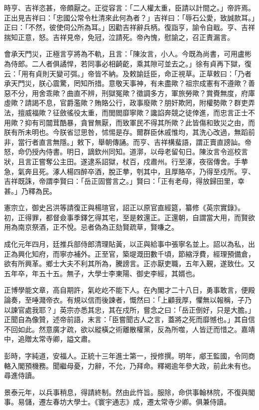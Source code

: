 \begin{pinyinscope}
時亨、吉祥恣甚，帝頗厭之。正從容言：「二人權太重，臣請以計間之。」帝許焉。正出見吉祥曰：「忠國公常令杜清來此何為者？」吉祥曰：「辱石公愛，致誠款耳。」正曰：「不然，彼使伺公所為耳。」因勸吉祥辭兵柄。復詣亨，諭令自戢。亨、吉祥揣知正意，怒。吉祥見帝，免冠，泣請死。帝內愧，慰諭之，召正責漏言。

會承天門災，正極言亨將為不軌，且言：「陳汝言，小人。今既為尚書，可用盧彬為侍郎。二人者俱譎悍，若同事必相齮齕，乘其隙可並去之。」徐有貞再下獄，復云：「用有貞則天變可弭。」帝皆不納。及敕諭廷臣，命正視草。正草敕曰：「乃者承天門災，朕心震驚，罔知所措。意敬天事神，有未盡歟？祖宗成憲有不遵歟？善惡不分，用舍乖歟？曲直不辨，刑獄冤歟？徵調多方，軍旅勞歟？賞賚無度，府庫虛歟？請謁不息，官爵濫歟？賄賂公行，政事廢歟？朋奸欺罔，附權勢歟？群吏弄法，擅威福歟？征斂徭役太重，而閭閻靡寧歟？讒諂奔競之徒倖進，而忠言正士不用歟？抑有司闒茸酷暴，貪冒無厭，而致軍民不得其所歟？此皆傷和致災之由，而朕有所未明也。今朕省愆思咎，怵惕是存。爾群臣休戚惟均，其洗心改過，無蹈前非，當行者直言無隱。」敕下，舉朝傳誦。而亨、吉祥構蜚語，謂正賣直謗訕。帝怒，命仍授內侍書。明日，謫欽州同知。道漷，以母老留旬日。陳汝言令巡校言狀，且言正嘗奪公主田。遂逮系詔獄，杖百，戍肅州。行至涿，夜宿傳舍。手拲急，氣奔且死。涿人楊四醉卒酒，脫正拲，刳其中，且厚賂卒，乃得至戍所。亨、吉祥既誅，帝謂李賢曰：「岳正固嘗言之。」賢曰：「正有老母，得放歸田里，幸甚。」乃釋為民。

憲宗立，御史呂洪等請復正與楊瑄官，詔正以原官直經筵，纂修《英宗實錄》。初，正得罪，都督僉事季鐸乞得其宅，至是敕還正。正還朝，自謂當大用，而賢欲用為南京祭酒，正不悅。忌者偽為正劾賢疏草，賢嗛之。

成化元年四月，廷推兵部侍郎清理貼黃，以正與給事中張寧名並上。詔以為私，出正為興化知府，而寧亦補外。正至官，築堤溉田數千頃，節縮浮費，經理預備倉，欲有所興革。鄉士大夫不利其所為，騰謗言。正亦厭吏職，五年入覲，遂致仕。又五年卒，年五十五。無子，大學士李東陽、御史李經，其婿也。

正博學能文章，高自期許，氣屹屹不能下人。在內閣才二十八日，勇事敢言，便殿論奏，至唾濺帝衣。有規以信而後諫者，慨然曰：「上顧我厚，懼無以報稱，子乃以諫官處我耶？」英宗亦悉其忠，其在戍所，嘗念之曰：「岳正倒好，只是大膽。」正聞自為像贊，述帝前語，末言：「臣嘗聞古人之言，蓋將之死而靡憾也。」其自信不回如此。然意廣才疏，欲以縱橫之術離散權黨，反為所噬，人皆迂而惜之。嘉靖中，追贈太常寺卿，謚文肅。

彭時，字純道，安福人。正統十三年進士第一，授修撰。明年，郕王監國，令同商輅入閣預機務。聞繼母憂，力辭，不允，乃拜命。釋褐逾年參大政，前此未有也。尋進侍讀。

景泰元年，以兵事稍息，得請終制。然由此忤旨。服除，命供事翰林院，不復與閣事。易儲，遷左春坊大學士。《寰宇通志》成，遷太常寺少卿。俱兼侍讀。


\end{pinyinscope}
